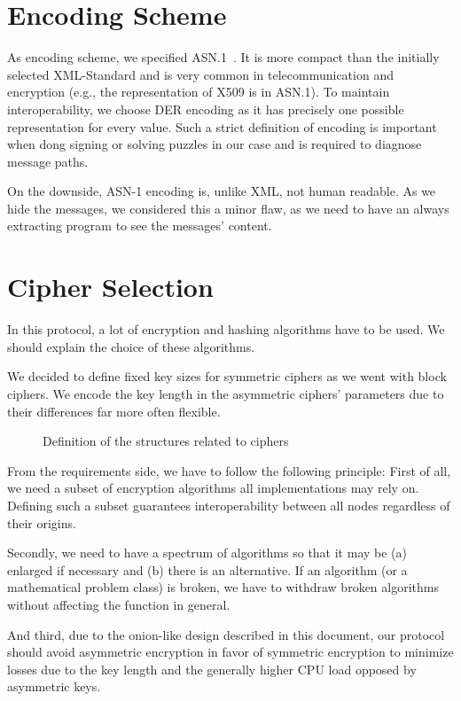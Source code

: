 \section{Encoding Scheme}
As encoding scheme, we specified ASN.1~\cite{dis19878824}. It is more compact than the initially selected XML-Standard and is very common in telecommunication and encryption (e.g., the representation of X509 is in ASN.1). To maintain interoperability, we choose DER encoding as it has precisely one possible representation for every value. Such a strict definition of encoding is important when dong signing or solving puzzles in our case and is required to diagnose message paths.

On the downside, ASN-1 encoding is, unlike XML, not human readable. As we hide the messages, we considered this a minor flaw, as we need to have an always extracting program to see the messages' content.

\section{Cipher Selection}
In this protocol, a lot of encryption and hashing algorithms have to be used. We should explain the choice of these algorithms. 

We decided to define fixed key sizes for symmetric ciphers as we went with block ciphers. We encode the key length in the asymmetric ciphers' parameters due to their differences far more often flexible.

\begin{figure}[ht]
	
	\caption{Definition of the structures related to ciphers}
	\label{fig:defCiphers}
\end{figure}

From the requirements side, we have to follow the following principle:
First of all, we need a subset of encryption algorithms all implementations may rely on. Defining such a subset guarantees interoperability between all nodes regardless of their origins. 

Secondly, we need to have a spectrum of algorithms so that it may be (a) enlarged if necessary and (b) there is an alternative. If an algorithm (or a mathematical problem class) is broken, we have to withdraw broken algorithms without affecting the function in general. 

And third, due to the onion-like design described in this document, our protocol should avoid asymmetric encryption in favor of symmetric encryption to minimize losses due to the key length and the generally higher CPU load opposed by asymmetric keys.


